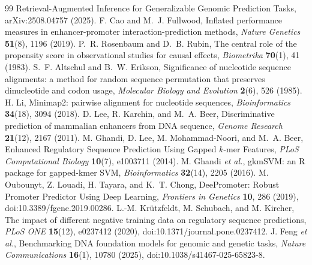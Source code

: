 \documentclass{ws-procs11x85}
\begin{document}
\begin{thebibliography}{99}
Retrieval-Augmented Inference for Generalizable Genomic Prediction Tasks, arXiv:2508.04757 (2025).
 F. Cao and M.~J. Fullwood, Inflated performance measures in enhancer-promoter
interaction-prediction methods, {\it Nature Genetics} {\bf 51}(8), 1196 (2019).
 P.~R. Rosenbaum and D.~B. Rubin, The central role of the propensity score in
observational studies for causal effects, {\it Biometrika} {\bf 70}(1), 41 (1983).
 S.~F. Altschul and B.~W. Erikson, Significance of nucleotide sequence alignments: a
method for random sequence permutation that preserves dinucleotide and codon usage, {\it Molecular
Biology and Evolution} {\bf 2}(6), 526 (1985).
 H. Li, Minimap2: pairwise alignment for nucleotide sequences, {\it Bioinformatics}
{\bf 34}(18), 3094 (2018).
 D. Lee, R. Karchin, and M.~A. Beer, Discriminative prediction of mammalian enhancers
from DNA sequence, {\it Genome Research} {\bf 21}(12), 2167 (2011).
 M. Ghandi, D. Lee, M. Mohammad-Noori, and M.~A. Beer, Enhanced Regulatory Sequence
Prediction Using Gapped $k$-mer Features, {\it PLoS Computational Biology} {\bf 10}(7), e1003711 (2014).
 M. Ghandi {\it et al.}, gkmSVM: an R package for gapped-kmer SVM, {\it
Bioinformatics} {\bf 32}(14), 2205 (2016).
 M. Oubounyt, Z. Louadi, H. Tayara, and K.~T. Chong, DeePromoter: Robust Promoter
Predictor Using Deep Learning, {\it Frontiers in Genetics} {\bf 10}, 286 (2019),
doi:10.3389/fgene.2019.00286.
 L.-M. Kr\"utzfeldt, M. Schubach, and M. Kircher, The impact of different negative
training data on regulatory sequence predictions, {\it PLoS ONE} {\bf 15}(12), e0237412 (2020),
doi:10.1371/journal.pone.0237412.
 J. Feng {\it et al.}, Benchmarking DNA foundation models for genomic and genetic tasks,
{\it Nature Communications} {\bf 16}(1), 10780 (2025), doi:10.1038/s41467-025-65823-8.
\end{thebibliography}
\end{document}
